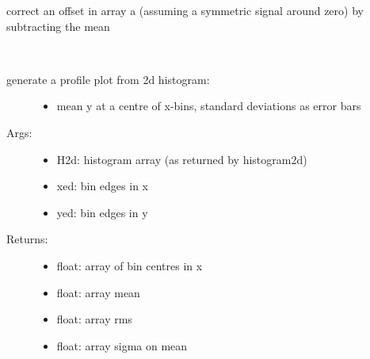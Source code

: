 \documentclass[letterpaper,10pt,english]{sphinxmanual}
\begin{document}

\begin{fulllineitems}
\label{\detokenize{index:PhyPraKit.PhyPraKit.offsetFilter}}
correct an offset in array a 
(assuming a symmetric signal around zero)
by subtracting the mean

\end{fulllineitems}


\begin{fulllineitems}
\label{\detokenize{index:PhyPraKit.PhyPraKit.profile2d}}~\begin{description}
\item[{generate a profile plot from 2d histogram:}] \leavevmode\begin{itemize}
\item {} 
mean y at a centre of x-bins, standard deviations as error bars

\end{itemize}

\item[{Args:}] \leavevmode\begin{itemize}
\item {} 
H2d: histogram array (as returned by histogram2d)

\item {} 
xed: bin edges in x

\item {} 
yed: bin edges in y

\end{itemize}

\item[{Returns:}] \leavevmode\begin{itemize}
\item {} 
float: array of bin centres in x

\item {} 
float: array mean

\item {} 
float: array rms

\item {} 
float: array sigma on mean

\end{itemize}

\end{description}

\end{fulllineitems}
\end{document}
